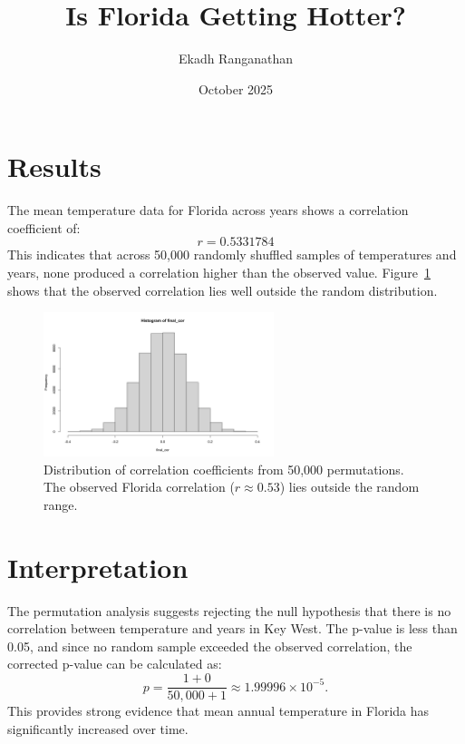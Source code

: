 \documentclass[11pt,a4paper]{article}
\title{\vspace{-2em}\textbf{Is Florida Getting Hotter?}\vspace{-1em}}
\author{Ekadh Ranganathan}
\date{October 2025}
\begin{document}
\maketitle
\vspace{-1em}

\section*{Results}
The mean temperature data for Florida across years shows a correlation coefficient of:
\[
r = 0.5331784
\]
This indicates that across 50{,}000 randomly shuffled samples of temperatures and years, none produced a correlation higher than the observed value. Figure~\ref{fig:hist} shows that the observed correlation lies well outside the random distribution.

\begin{figure}[h!]
\centering
\includegraphics[width=0.6\textwidth]{../data/Histogram.png}
\caption{Distribution of correlation coefficients from 50,000 permutations. The observed Florida correlation ($r \approx 0.53$) lies outside the random range.}
\label{fig:hist}
\end{figure}

\section*{Interpretation}
The permutation analysis suggests rejecting the null hypothesis that there is no correlation between temperature and years in Key West. The p-value is less than 0.05, and since no random sample exceeded the observed correlation, the corrected p-value can be calculated as:
\[
p = \frac{1 + 0}{50{,}000 + 1} \approx 1.99996\times10^{-5}.
\]
This provides strong evidence that mean annual temperature in Florida has significantly increased over time.
\end{document}
